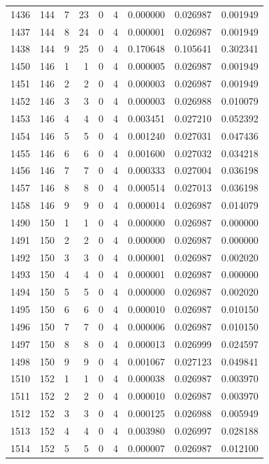 \begin{longtable}{rrrrrrrrr}
1436 & 144 & 7 & 23 & 0 & 4 & 0.000000 & 0.026987 & 0.001949 \\
1437 & 144 & 8 & 24 & 0 & 4 & 0.000001 & 0.026987 & 0.001949 \\
1438 & 144 & 9 & 25 & 0 & 4 & 0.170648 & 0.105641 & 0.302341 \\
1450 & 146 & 1 & 1 & 0 & 4 & 0.000005 & 0.026987 & 0.001949 \\
1451 & 146 & 2 & 2 & 0 & 4 & 0.000003 & 0.026987 & 0.001949 \\
1452 & 146 & 3 & 3 & 0 & 4 & 0.000003 & 0.026988 & 0.010079 \\
1453 & 146 & 4 & 4 & 0 & 4 & 0.003451 & 0.027210 & 0.052392 \\
1454 & 146 & 5 & 5 & 0 & 4 & 0.001240 & 0.027031 & 0.047436 \\
1455 & 146 & 6 & 6 & 0 & 4 & 0.001600 & 0.027032 & 0.034218 \\
1456 & 146 & 7 & 7 & 0 & 4 & 0.000333 & 0.027004 & 0.036198 \\
1457 & 146 & 8 & 8 & 0 & 4 & 0.000514 & 0.027013 & 0.036198 \\
1458 & 146 & 9 & 9 & 0 & 4 & 0.000014 & 0.026987 & 0.014079 \\
1490 & 150 & 1 & 1 & 0 & 4 & 0.000000 & 0.026987 & 0.000000 \\
1491 & 150 & 2 & 2 & 0 & 4 & 0.000000 & 0.026987 & 0.000000 \\
1492 & 150 & 3 & 3 & 0 & 4 & 0.000001 & 0.026987 & 0.002020 \\
1493 & 150 & 4 & 4 & 0 & 4 & 0.000001 & 0.026987 & 0.000000 \\
1494 & 150 & 5 & 5 & 0 & 4 & 0.000000 & 0.026987 & 0.002020 \\
1495 & 150 & 6 & 6 & 0 & 4 & 0.000010 & 0.026987 & 0.010150 \\
1496 & 150 & 7 & 7 & 0 & 4 & 0.000006 & 0.026987 & 0.010150 \\
1497 & 150 & 8 & 8 & 0 & 4 & 0.000013 & 0.026999 & 0.024597 \\
1498 & 150 & 9 & 9 & 0 & 4 & 0.001067 & 0.027123 & 0.049841 \\
1510 & 152 & 1 & 1 & 0 & 4 & 0.000038 & 0.026987 & 0.003970 \\
1511 & 152 & 2 & 2 & 0 & 4 & 0.000010 & 0.026987 & 0.003970 \\
1512 & 152 & 3 & 3 & 0 & 4 & 0.000125 & 0.026988 & 0.005949 \\
1513 & 152 & 4 & 4 & 0 & 4 & 0.003980 & 0.026997 & 0.028188 \\
1514 & 152 & 5 & 5 & 0 & 4 & 0.000007 & 0.026987 & 0.012100 \\

\end{longtable}
